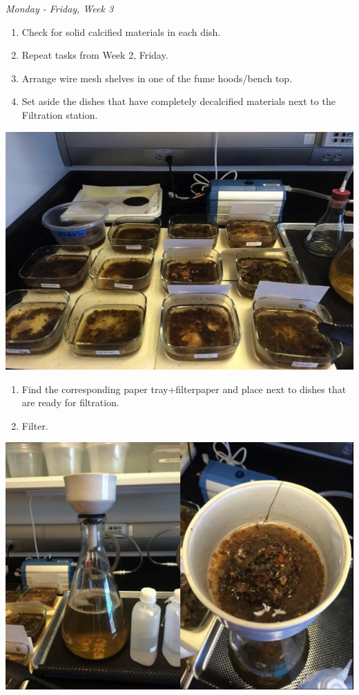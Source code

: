 \documentclass[]{book}
\providecommand{\tightlist}{%
  \setlength{\itemsep}{0pt}\setlength{\parskip}{0pt}}
\begin{document}
\emph{Monday - Friday, Week 3}

\begin{enumerate}
\def\labelenumi{\arabic{enumi}.}
\tightlist
\item
  Check for solid calcified materials in each dish.
\item
  Repeat tasks from Week 2, Friday.
\item
  Arrange wire mesh shelves in one of the fume hoods/bench top.
\item
  Set aside the dishes that have completely decalcified materials next to the Filtration station.
\end{enumerate}

\includegraphics{images/DailyTasks12.jpg}

\begin{enumerate}
\def\labelenumi{\arabic{enumi}.}
\setcounter{enumi}{4}
\tightlist
\item
  Find the corresponding paper tray+filterpaper and place next to dishes that are ready for filtration.
\item
  Filter.
\end{enumerate}

\includegraphics{images/DailyTasks13.jpg}
\end{document}
